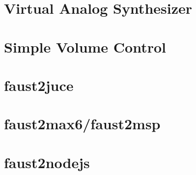 \let\mypdfximage\pdfximage\def\pdfximage{\immediate\mypdfximage}\documentclass[twoside]{book}
\newcommand{\+}{\discretionary{\mbox{\scriptsize$\hookleftarrow$}}{}{}}
\begin{document}
\chapter{Virtual Analog Synthesizer}
\label{md__c_1__users_fab_src__github_branches__neural_amp_modeler_plugin_i_plug2__dependencies__build_d689a630d849ab26afdd3f44bb5bdebf}

\chapter{Simple Volume Control}
\label{md__c_1__users_fab_src__github_branches__neural_amp_modeler_plugin_i_plug2__dependencies__build_0cb75364e1bcda8932b5c2b9091dd621}

\chapter{faust2juce}
\label{md__c_1__users_fab_src__github_branches__neural_amp_modeler_plugin_i_plug2__dependencies__build_579fefd811972bd94a460310420d2cd1}

\chapter{faust2max6/faust2msp}
\label{md__c_1__users_fab_src__github_branches__neural_amp_modeler_plugin_i_plug2__dependencies__build_e139210c7459bd8b712221dd9976dc81}

\chapter{faust2nodejs}
\label{md__c_1__users_fab_src__github_branches__neural_amp_modeler_plugin_i_plug2__dependencies__build_c3442267ddbfbd47e4c796048a15972b}

\end{document}
